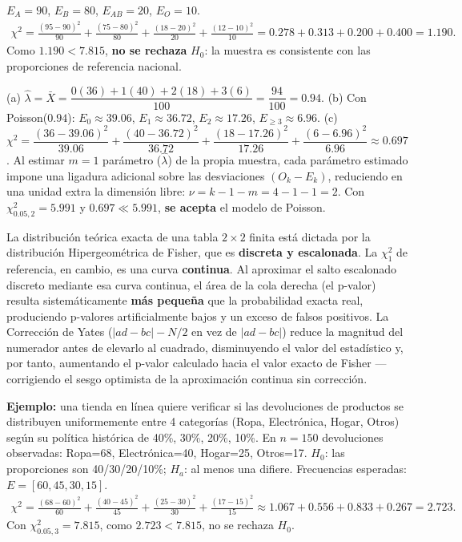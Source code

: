 \begin{solproblema}[prob:da2eb15]
	$E_A=90$, $E_B=80$, $E_{AB}=20$, $E_O=10$.
	\begin{align*}
		\chi^2 = \frac{(95-90)^2}{90}+\frac{(75-80)^2}{80}+\frac{(18-20)^2}{20}+\frac{(12-10)^2}{10} = 0.278+0.313+0.200+0.400 = 1.190.
	\end{align*}
	Como $1.190 < 7.815$, \textbf{no se rechaza} $H_0$: la muestra es consistente con las proporciones de referencia nacional.
\end{solproblema}

\begin{solproblema}[prob:d6f0154]
	(a) $\hat\lambda = \bar X = \dfrac{0(36)+1(40)+2(18)+3(6)}{100} = \dfrac{94}{100}=0.94$.
	(b) Con Poisson($0.94$): $E_0\approx39.06$, $E_1\approx36.72$, $E_2\approx17.26$, $E_{\ge3}\approx6.96$.
	(c) $\chi^2 = \dfrac{(36-39.06)^2}{39.06}+\dfrac{(40-36.72)^2}{36.72}+\dfrac{(18-17.26)^2}{17.26}+\dfrac{(6-6.96)^2}{6.96} \approx0.697$. Al estimar $m=1$ parámetro ($\hat\lambda$) de la propia muestra, cada parámetro estimado impone una ligadura adicional sobre las desviaciones $(O_k-E_k)$, reduciendo en una unidad extra la dimensión libre: $\nu=k-1-m=4-1-1=2$. Con $\chi^2_{0.05,2}=5.991$ y $0.697\ll5.991$, \textbf{se acepta} el modelo de Poisson.
\end{solproblema}

\begin{solproblema}[prob:f622374]
	La distribución teórica exacta de una tabla $2\times2$ finita está dictada por la distribución Hipergeométrica de Fisher, que es \textbf{discreta y escalonada}. La $\chi^2_1$ de referencia, en cambio, es una curva \textbf{continua}. Al aproximar el salto escalonado discreto mediante esa curva continua, el área de la cola derecha (el p-valor) resulta sistemáticamente \textbf{más pequeña} que la probabilidad exacta real, produciendo p-valores artificialmente bajos y un exceso de falsos positivos. La Corrección de Yates ($|ad-bc|-N/2$ en vez de $|ad-bc|$) reduce la magnitud del numerador antes de elevarlo al cuadrado, disminuyendo el valor del estadístico y, por tanto, aumentando el p-valor calculado hacia el valor exacto de Fisher — corrigiendo el sesgo optimista de la aproximación continua sin corrección.
\end{solproblema}

\begin{solproblema}[prob:369a6a1]
	\textbf{Ejemplo:} una tienda en línea quiere verificar si las devoluciones de productos se distribuyen uniformemente entre 4 categorías (Ropa, Electrónica, Hogar, Otros) según su política histórica de 40\%, 30\%, 20\%, 10\%. En $n=150$ devoluciones observadas: Ropa=68, Electrónica=40, Hogar=25, Otros=17. $H_0$: las proporciones son 40/30/20/10\%; $H_a$: al menos una difiere. Frecuencias esperadas: $E=[60,45,30,15]$.
	\begin{align*}
		\chi^2 = \frac{(68-60)^2}{60}+\frac{(40-45)^2}{45}+\frac{(25-30)^2}{30}+\frac{(17-15)^2}{15} \approx1.067+0.556+0.833+0.267 = 2.723.
	\end{align*}
	Con $\chi^2_{0.05,3}=7.815$, como $2.723<7.815$, no se rechaza $H_0$.
\end{solproblema}
